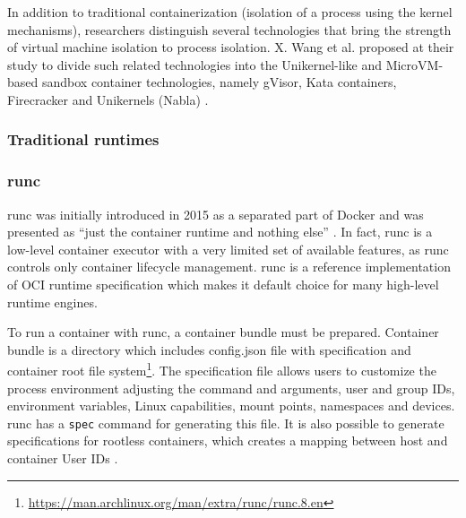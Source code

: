 In addition to traditional containerization (isolation of a process using the kernel mechanisms), researchers distinguish several technologies that bring the strength of virtual machine isolation to process isolation. X. Wang et al. proposed at their study to divide such related technologies into the Unikernel-like and MicroVM-based sandbox container technologies, namely gVisor, Kata containers, Firecracker and Unikernels (Nabla) \cite{j:1}.

\clearpage
\subsubsection{Traditional runtimes}

\subsubsection*{runc}

runc was initially introduced in 2015 as a separated part of Docker and was presented as ``just the container runtime and nothing else'' \cite{b:dockerrunc}. In fact, runc is a low-level container executor with a very limited set of available features, as runc controls only container lifecycle management. runc is a reference implementation of OCI runtime specification which makes it default choice for many high-level runtime engines.

To run a container with runc, a container bundle must be prepared. Container bundle is a directory which includes config.json file with specification and container root file system\footnote{\url{https://man.archlinux.org/man/extra/runc/runc.8.en}}. The specification file allows users to customize the process environment adjusting the command and arguments, user and group IDs, environment variables, Linux capabilities, mount points, namespaces and devices. runc has a \texttt{spec} command for generating this file. It is also possible to generate specifications for rootless containers, which creates a mapping between host and container User IDs \cite{j:2}.

